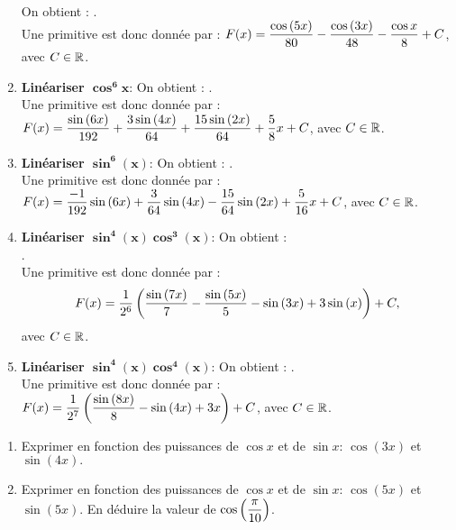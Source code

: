 \documentclass[a4paper, 11pt]{article}
\begin{document}
\begin{correction}
\begin{enumerate}
$$\begin{array}{rcl}
\end{array}$$
On obtient : .\\
Une primitive est donc donn\'ee par : $F(x) = \displaystyle\frac{\cos{(5x)}}{80}-\displaystyle\frac{\cos{(3x)}}{48}-\displaystyle\frac{\cos{x}}{8}+C$, avec $C \in \mathbb{R}$.
\item \textbf{Lin\'eariser $\mathbf{\cos^6{x}}$}: On obtient : .\\
Une primitive est donc donn\'ee par : $F(x) = \displaystyle\frac{\sin{(6x)}}{192}+\displaystyle\frac{3\sin{(4x)}}{64}+\displaystyle\frac{15\sin{(2x)}}{64}+\displaystyle\frac{5}{8}x+C$, avec $C \in \mathbb{R}$.
\item \textbf{Lin\'eariser $\mathbf{\sin^6{(x)}}$}: On obtient : .\\
Une primitive est donc donn\'ee par : $F(x) = \displaystyle\frac{-1}{192} \sin{(6x)} +\displaystyle\frac{3}{64}\sin{(4x)}-\displaystyle\frac{15}{64}\sin{(2x)}+\displaystyle\frac{5}{16}x+C$, avec $C \in \mathbb{R}$.
\item \textbf{Lin\'eariser $\mathbf{\sin^4{(x)}\cos^3{(x)}}$}: On obtient :\\
 .\\
 
Une primitive est donc donn\'ee par : $$F(x) = \displaystyle\frac{1}{2^6}\left( \displaystyle\frac{ \sin{(7x)}}{7} -\displaystyle\frac{\sin{(5x)}}{5}-\sin{(3x)}+3\sin{(x)} \right)+C,$$ avec $C \in \mathbb{R}$.
\item \textbf{Lin\'eariser $\mathbf{\sin^4{(x)}\cos^4{(x)}}$}: On obtient : .\\
Une primitive est donc donn\'ee par : $F(x) = \displaystyle\frac{1}{2^7}\left(  \displaystyle\frac{\sin{(8x)}}{8}-\sin{(4x)}+3x \right)+C$, avec $C \in \mathbb{R}$.
\end{enumerate}
\end{correction}








\begin{exercice}  \;
\begin{enumerate}
\item Exprimer en fonction des puissances de $\cos{x}$ et de $\sin{x}$: $\cos{(3x)}$ et $\sin{(4x)}.$
\item Exprimer en fonction des puissances de $\cos{x}$ et de $\sin{x}$: $\cos{(5x)}$ et $\sin{(5x)}.$ En d\'eduire la valeur de $\cos{\left(  \displaystyle\frac{\pi}{10}\right)}$.
\end{enumerate}
\end{exercice}
\end{document}
